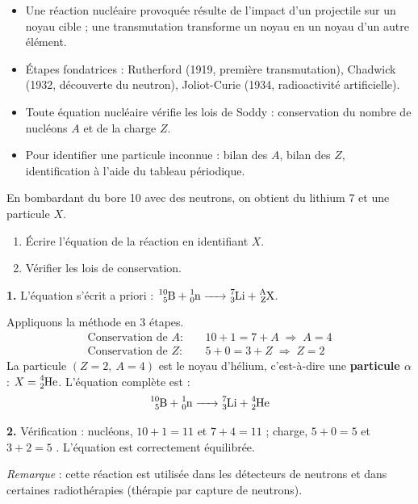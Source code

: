 \documentclass[11pt]{article}
\newcommand{\cle}[1]{{\popxbold\color{popdark}#1}}
\begin{document}
\begin{aretenir}
\begin{itemize}
\item Une \cle{réaction nucléaire provoquée} résulte de l'impact d'un projectile sur un noyau cible ; une \cle{transmutation} transforme un noyau en un noyau d'un autre élément.
\item Étapes fondatrices : Rutherford (1919, première transmutation), Chadwick (1932, découverte du neutron), Joliot-Curie (1934, radioactivité artificielle).
\item Toute équation nucléaire vérifie les \cle{lois de Soddy} : conservation du nombre de nucléons $A$ et de la charge $Z$.
\item Pour identifier une particule inconnue : bilan des $A$, bilan des $Z$, identification à l'aide du tableau périodique.
\end{itemize}
\end{aretenir}

\begin{exoresolu}
En bombardant du bore 10 avec des neutrons, on obtient du lithium 7 et une particule $X$.
\begin{enumerate}
\item Écrire l'équation de la réaction en identifiant $X$.
\item Vérifier les lois de conservation.
\end{enumerate}
\tcblower
\textbf{1.} L'équation s'écrit a priori : $\ce{^{10}_{5}B + ^{1}_{0}n -> ^{7}_{3}Li + ^{A}_{Z}X}$.

Appliquons la méthode en 3 étapes.
\begin{align*}
\text{Conservation de } A : \quad & 10 + 1 = 7 + A \;\Rightarrow\; A = 4 \\
\text{Conservation de } Z : \quad & 5 + 0 = 3 + Z \;\Rightarrow\; Z = 2
\end{align*}
La particule $(Z = 2,\ A = 4)$ est le noyau d'hélium, c'est-à-dire une \textbf{particule $\alpha$} : $X = \ce{^{4}_{2}He}$. L'équation complète est :
\[
\ce{^{10}_{5}B + ^{1}_{0}n -> ^{7}_{3}Li + ^{4}_{2}He}
\]

\textbf{2.} Vérification : nucléons, $10 + 1 = 11$ et $7 + 4 = 11$ \checkmark ; charge, $5 + 0 = 5$ et $3 + 2 = 5$ \checkmark. L'équation est correctement équilibrée.

\emph{Remarque} : cette réaction est utilisée dans les détecteurs de neutrons et dans certaines radiothérapies (thérapie par capture de neutrons).
\end{exoresolu}
\end{document}
